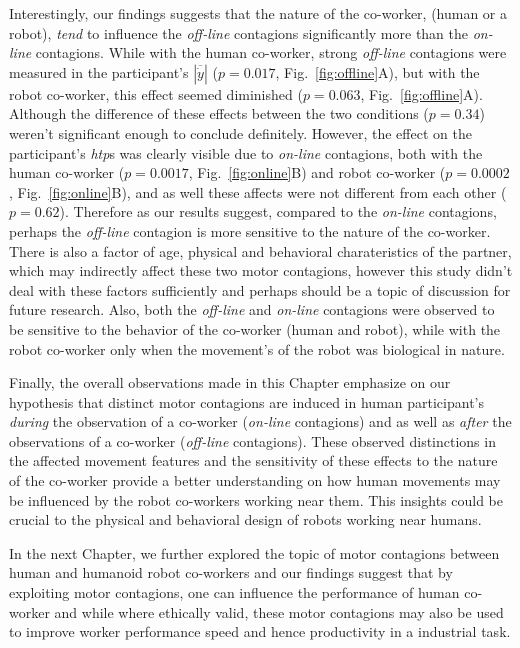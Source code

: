 Interestingly, our findings suggests that the nature of the co-worker, (human or a robot), \textit{tend} to influence the \textit{off-line} contagions significantly more than the \textit{on-line} contagions. While with the human co-worker, strong \textit{off-line} contagions were measured in the participant's $|\overline{\dot{y}}|$ ($p = 0.017$, Fig.~\ref{fig:offline}A), but with the robot co-worker, this effect seemed diminished ($p = 0.063$, Fig.~\ref{fig:offline}A). Although the difference of these effects between the two conditions ($p = 0.34$) weren't significant enough to conclude definitely. However, the effect on the participant's {\it htp}s was clearly visible due to \textit{on-line} contagions, both with the human co-worker ($p = 0.0017$, Fig.~\ref{fig:online}B) and robot co-worker ($p = 0.0002$, Fig.~\ref{fig:online}B), and as well these affects were not different from each other ($p = 0.62$). Therefore as our results suggest, compared to the \textit{on-line} contagions, perhaps the \textit{off-line} contagion is more sensitive to the nature of the co-worker. There is also a factor of age, physical and behavioral charateristics of the partner, which may indirectly affect these two motor contagions, however this study didn't deal with these factors sufficiently and perhaps should be a topic of discussion for future research. Also, both the \textit{off-line} and \textit{on-line} contagions were observed to be sensitive to the behavior of the co-worker (human and robot), while with the robot co-worker only when the movement's of the robot was biological in nature. 

Finally, the overall observations made in this Chapter emphasize on our hypothesis that distinct motor contagions are induced in human participant's \emph{during} the observation of a co-worker (\textit{on-line} contagions) and as well as \emph{after} the observations of a co-worker (\textit{off-line} contagions). These observed distinctions in the affected movement features and the sensitivity of these effects to the nature of the co-worker provide a better understanding on how human movements may be influenced by the robot co-workers working near them. This insights could be crucial to the physical and behavioral design of robots working near humans.


In the next Chapter, we further explored the topic of motor contagions between human and humanoid robot co-workers and our findings suggest that by exploiting motor contagions, one can influence the performance of human co-worker and while where ethically valid, these motor contagions may also be used to improve worker performance speed and hence productivity in a industrial task.

\clearpage %